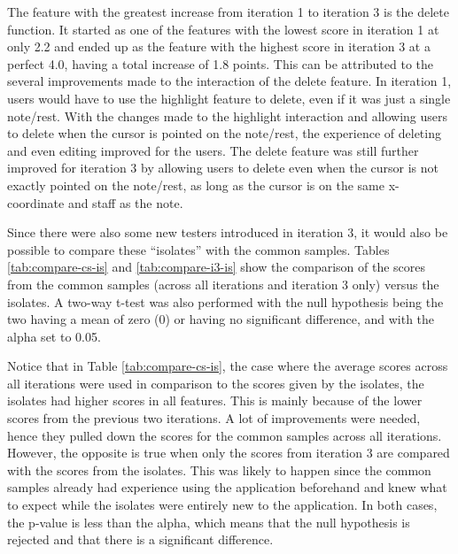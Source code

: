 		The feature with the greatest increase from iteration 1 to iteration 3 is the delete function. It started as one of the features with the lowest score in iteration 1 at only 2.2 and ended up as the feature with the highest score in iteration 3 at a perfect 4.0, having a total increase of 1.8 points. This can be attributed to the several improvements made to the interaction of the delete feature. In iteration 1, users would have to use the highlight feature to delete, even if it was just a single note/rest. With the changes made to the highlight interaction and allowing users to delete when the cursor is pointed on the note/rest, the experience of deleting and even editing improved for the users. The delete feature was still further improved for iteration 3 by allowing users to delete even when the cursor is not exactly pointed on the note/rest, as long as the cursor is on the same x-coordinate and staff as the note. 


		Since there were also some new testers introduced in iteration 3, it would also be possible to compare these ``isolates'' with the common samples. Tables \ref{tab:compare-cs-is} and \ref{tab:compare-i3-is} show the comparison of the scores from the common samples (across all iterations and iteration 3 only) versus the isolates. A two-way t-test was also performed with the null hypothesis being the two having a mean of zero (0) or having no significant difference, and with the alpha set to 0.05.

		Notice that in Table \ref{tab:compare-cs-is}, the case where the average scores across all iterations were used in comparison to the scores given by the isolates, the isolates had higher scores in all features. This is mainly because of the lower scores from the previous two iterations. A lot of improvements were needed, hence they pulled down the scores for the common samples across all iterations. However, the opposite is true when only the scores from iteration 3 are compared with the scores from the isolates. This was likely to happen since the common samples already had experience using the application beforehand and knew what to expect while the isolates were entirely new to the application. In both cases, the p-value is less than the alpha, which means that the null hypothesis is rejected and that there is a significant difference. 


